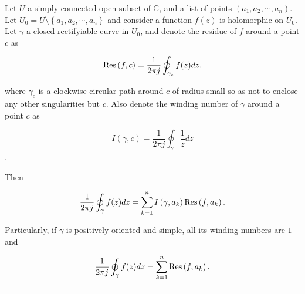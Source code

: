 \begin{theorem}\label{theo:residue_theorem} %
	Let $U$ a simply connected open subset of $\mathbb{C}$, and a list of points $\left(a_1,a_2,\cdots,a_n\right)$. Let $U_0 = U\setminus\left\{a_1,a_2,\cdots,a_n\right\}$ and consider a function $f(z)$ is holomorphic on $U_0$. Let $\gamma$ a closed rectifyiable curve in  $U_0$, and denote the residue of $f$ around a point $c$ as

\begin{equation} \operatorname{Res}\left(f,c\right) = \dfrac{1}{2\pi j}\oint_{\gamma_c} f(z)dz ,\end{equation}

	\noindent where $\gamma_c$ is a clockwise circular path around $c$ of radius small so as not to enclose any other singularities but $c$. Also denote the winding number of $\gamma$ around a point $c$ as

\begin{equation} I\left(\gamma,c\right) = \dfrac{1}{2\pi j}\oint_\gamma \dfrac{1}{z} dz\end{equation}.

	Then

\begin{equation} \dfrac{1}{2\pi j}\oint_\gamma f(z)dz = \sum_{k=1}^n I\left(\gamma,a_k\right)\operatorname{Res}\left(f,a_k\right) .\end{equation}

	Particularly, if $\gamma$ is positively oriented and simple, all its winding numbers are $1$ and

\begin{equation} \dfrac{1}{2\pi j}\oint_\gamma f(z)dz = \sum_{k=1}^n \operatorname{Res}\left(f,a_k\right) .\end{equation}

\end{theorem}\vspace{3mm}\hrule\vspace{3mm}%

